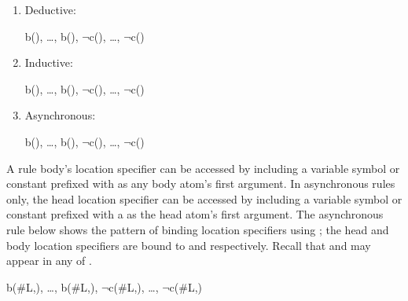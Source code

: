\begin{enumerate}

\item Deductive:

\begin{Drules}
        {b(), \ldots, b(), $\lnot$c(), \ldots, $\lnot$c()}
\end{Drules}

\item Inductive:

\begin{Drules}
        {b(), \ldots, b(), $\lnot$c(), \ldots, $\lnot$c()}
\end{Drules}

\item Asynchronous:

\begin{Drules}
        {b(), \ldots, b(), $\lnot$c(), \ldots, $\lnot$c()}
\end{Drules}
\end{enumerate}

A rule body's location specifier can be accessed by including a variable symbol
or constant prefixed with \dedalus{#} as any body atom's first argument.  In
asynchronous rules only, the head location specifier can be accessed by
including a variable symbol or constant prefixed with a \dedalus{#} as the head
atom's first argument.  The asynchronous rule below shows the pattern of binding location specifiers using \dedalus{#}; the
head and body location specifiers are bound to  and  respectively.
Recall that  and  may appear in any of .

\begin{Drules}
        {b(#L,), \ldots, b(#L,), $\lnot$c(#L,), \ldots, $\lnot$c(#L,)}
\end{Drules}


